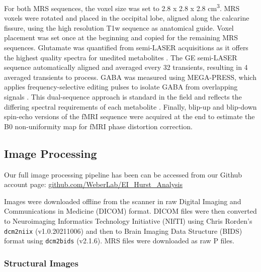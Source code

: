 \documentclass[
true
]{sn-jnl}
\begin{document}
For both MRS sequences, the voxel size was set to 2.8 x 2.8 x 2.8
cm\textsuperscript{3}. MRS voxels were rotated and placed in the
occipital lobe, aligned along the calcarine fissure, using the high
resolution T1w sequence as anatomical guide. Voxel placement was set
once at the beginning and copied for the remaining MRS sequences.
Glutamate was quantified from semi-LASER acquisitions as it offers the
highest quality spectra for unedited metabolites
\citep{wilsonMethodologicalConsensusClinical2019}. The GE semi-LASER
sequence automatically aligned and averaged every 32 transients,
resulting in 4 averaged transients to process. GABA was measured using
MEGA-PRESS, which applies frequency-selective editing pulses to isolate
GABA from overlapping signals
\citep{peekComprehensiveGuideMEGAPRESS2023}. This dual-sequence approach
is standard in the field and reflects the differing spectral
requirements of each metabolite
\citep{vanveenendaalGlutamateQuantificationPRESS2018}. Finally, blip-up
and blip-down spin-echo versions of the fMRI sequence were acquired at
the end to estimate the B0 non-uniformity map for fMRI phase distortion
correction.

\subsection{Image Processing}\label{image-processing}

Our full image processing pipeline has been can be accessed from our
Github account page:
\href{https://github.com/WeberLab/EI_Hurst_Analysis}{github.com/WeberLab/EI\_Hurst\_Analysis}

Images were downloaded offline from the scanner in raw Digital Imaging
and Communications in Medicine (DICOM) format. DICOM files were then
converted to Neuroimaging Informatics Technology Initiative (NIfTI)
using Chris Rorden's \texttt{dcm2niix}
\citep{liFirstStepNeuroimaging2016} (v1.0.20211006) and then to Brain
Imaging Data Structure (BIDS) \citep{gorgolewskiBrainImagingData2016}
format using \texttt{dcm2bids} \citep{boreDcm2Bids2023} (v2.1.6). MRS
files were downloaded as raw P files.

\subsubsection{Structural Images}\label{structural-images}
\end{document}
